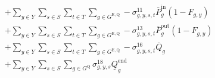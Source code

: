 \documentclass{article}
\newcommand{\sStorage}{G^{\mathrm{Q}}}
\newcommand{\sStorageExisting}{G^{\mathrm{E,Q}}}
\newcommand{\sStorageCandidate}{G^{\mathrm{C,Q}}}
\newcommand{\sYears}{Y}
\newcommand{\sScenarios}{S}
\newcommand{\sIntervals}{T}
\newcommand{\iGenerator}{g}
\newcommand{\iYear}{y}
\newcommand{\iScenario}{s}
\newcommand{\iInterval}{t}
\newcommand{\cPowerChargingMax}[1][\iGenerator]{\overline{P}^{\mathrm{in}}_{#1}}
\newcommand{\cPowerDischargingMax}[1][\iGenerator]{\overline{P}^{\mathrm{out}}_{#1}}
\newcommand{\cStorageUnitEnergyMax}[1][\iGenerator]{\overline{Q}_{#1}}
\newcommand{\cStorageUnitEnergyIntervalEndMin}[1][\iGenerator]{\underline{Q}^{\mathrm{end}}_{#1}}
\newcommand{\cRetirementIndicator}[1][\iGenerator,\iYear]{F_{#1}}
\newcommand{\vPowerIn}[1][\iGenerator,\iYear,\iScenario,\iInterval]{p^{\mathrm{in}}_{#1}}
\newcommand{\vPowerOut}[1][\iGenerator,\iYear,\iScenario,\iInterval]{p^{\mathrm{out}}_{#1}}
\newcommand{\vStorageUnitEnergy}[1][\iGenerator,\iYear,\iScenario,\iInterval]{q_{#1}}
\newcommand{\vInstalledCapacityTotal}[1][\iGenerator,\iYear]{a_{#1}}
\newcommand{\dNonNegativeCharging}[1][\iGenerator,\iYear,\iScenario,\iInterval]{\sigma_{#1}^{9}}
\newcommand{\dNonNegativeDischarging}[1][\iGenerator,\iYear,\iScenario,\iInterval]{\sigma_{#1}^{10}}
\newcommand{\dMaxChargingRateExisting}[1][\iGenerator,\iYear,\iScenario,\iInterval]{\sigma_{#1}^{11}}
\newcommand{\dMaxChargingRateCandidate}[1][\iGenerator,\iYear,\iScenario,\iInterval]{\sigma_{#1}^{12}}
\newcommand{\dMaxDischargingRateExisting}[1][\iGenerator,\iYear,\iScenario,\iInterval]{\sigma_{#1}^{13}}
\newcommand{\dMaxDischargingRateCandidate}[1][\iGenerator,\iYear,\iScenario,\iInterval]{\sigma_{#1}^{14}}
\newcommand{\dNonNegativeStorageEnergy}[1][\iGenerator,\iYear,\iScenario,\iInterval]{\sigma_{#1}^{15}}
\newcommand{\dMaxStorageEnergyExisting}[1][\iGenerator,\iYear,\iScenario,\iInterval]{\sigma_{#1}^{16}}
\newcommand{\dMaxStorageEnergyCandidate}[1][\iGenerator,\iYear,\iScenario,\iInterval]{\sigma_{#1}^{17}}
\newcommand{\dMinStorageEnergyIntervalEnd}[1][\iGenerator,\iYear,\iScenario]{\sigma_{#1}^{18}}
\begin{document}
\begin{align}
\begin{split}
& + \sum\limits_{\iYear \in \sYears}\sum\limits_{\iScenario \in \sScenarios}\sum\limits_{\iInterval \in \sIntervals} \sum\limits_{\iGenerator \in \sStorageExisting} - \dMaxChargingRateExisting \cPowerChargingMax \left(1 - \cRetirementIndicator\right)\\
& + \sum\limits_{\iYear \in \sYears}\sum\limits_{\iScenario \in \sScenarios}\sum\limits_{\iInterval \in \sIntervals} \sum\limits_{\iGenerator \in \sStorageExisting} - \dMaxDischargingRateExisting \cPowerDischargingMax \left(1 - \cRetirementIndicator\right)\\
& + \sum\limits_{\iYear \in \sYears}\sum\limits_{\iScenario \in \sScenarios}\sum\limits_{\iInterval \in \sIntervals} \sum\limits_{\iGenerator \in \sStorageExisting} - \dMaxStorageEnergyExisting \cStorageUnitEnergyMax\\
& + \sum\limits_{\iYear \in \sYears}\sum\limits_{\iScenario \in \sScenarios} \sum\limits_{\iGenerator \in \sStorage} \dMinStorageEnergyIntervalEnd \cStorageUnitEnergyIntervalEndMin\\

\end{split}
\end{align}
\end{document}
